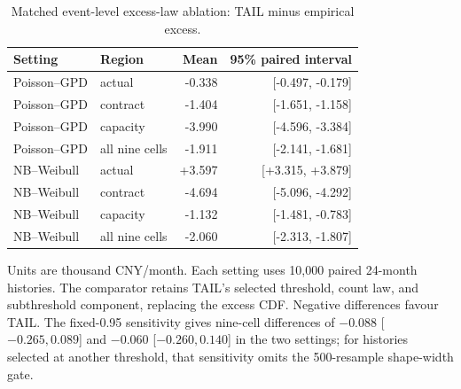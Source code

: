 \begin{table}[tbp]\centering\small
\caption{Matched event-level excess-law ablation: TAIL minus empirical excess.}\label{tab:tail-excess-ablation}
\begin{tabular}{@{}llrr@{}}\toprule Setting & Region & Mean & 95\% paired interval\\\midrule
Poisson--GPD & actual & -0.338 & [-0.497, -0.179]\\
Poisson--GPD & contract & -1.404 & [-1.651, -1.158]\\
Poisson--GPD & capacity & -3.990 & [-4.596, -3.384]\\
Poisson--GPD & all nine cells & -1.911 & [-2.141, -1.681]\\
NB--Weibull & actual & +3.597 & [+3.315, +3.879]\\
NB--Weibull & contract & -4.694 & [-5.096, -4.292]\\
NB--Weibull & capacity & -1.132 & [-1.481, -0.783]\\
NB--Weibull & all nine cells & -2.060 & [-2.313, -1.807]\\
\bottomrule\end{tabular}\par\smallskip\footnotesize Units are thousand CNY/month. Each setting uses 10,000 paired 24-month histories. The comparator retains TAIL's selected threshold, count law, and subthreshold component, replacing the excess CDF. Negative differences favour TAIL. The fixed-0.95 sensitivity gives nine-cell differences of $-0.088$ [$-0.265,0.089$] and $-0.060$ [$-0.260,0.140$] in the two settings; for histories selected at another threshold, that sensitivity omits the 500-resample shape-width gate.\end{table}